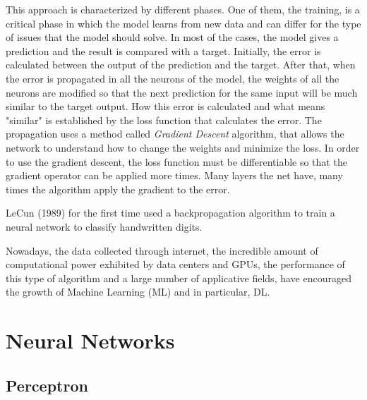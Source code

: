 \documentclass[12pt]{report}
\begin{document}
This approach is characterized by different phases.
One of them, the training, is a critical phase in which the model learns from new data and can differ for the type of issues that the model should solve.
In most of the cases, the model gives a prediction and the result is compared with a target. Initially, the error is calculated between the
output of the prediction and the target. After that, when the error is propagated in all the neurons of the model,
the weights of all the neurons are modified so that the next prediction for the same input will be much similar to the
target output. 
How this error is calculated and what means "similar" is established by the loss function that calculates the error.
The propagation uses a method called \textit{Gradient Descent} algorithm, that allows the network 
to understand how to change the weights and minimize the loss.
In order to use the gradient descent, the loss function must be differentiable so that
the gradient operator can be applied more times.
Many layers the net have, many times the algorithm apply the gradient to the error.

LeCun (1989) for the first time used a backpropagation algorithm to train a neural network to classify handwritten digits.

Nowadays, the data collected through internet, the incredible amount of computational power exhibited
by data centers and GPUs, the performance of this type of algorithm and a large number of applicative fields,
have encouraged the growth of Machine Learning (ML) and in particular, DL. 


\section{Neural Networks}

\subsection{Perceptron}
\end{document}
